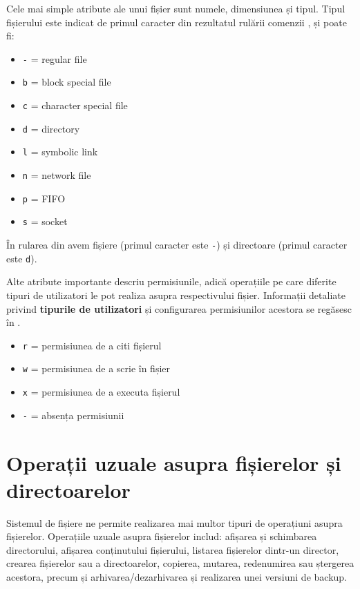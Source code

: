Cele mai simple atribute ale unui fișier sunt numele, dimensiunea și tipul.
Tipul fișierului este indicat de primul caracter din rezultatul rulării comenzii , și poate fi:

\begin{itemize}
  \item \texttt{-} = regular file
  \item \texttt{b} = block special file
  \item \texttt{c} = character special file
  \item \texttt{d} = directory
  \item \texttt{l} = symbolic link
  \item \texttt{n} = network file
  \item \texttt{p} = FIFO
  \item \texttt{s} = socket
\end{itemize}

În rularea din  avem fișiere (primul caracter este \texttt{-}) și directoare (primul caracter este \texttt{d}).

Alte atribute importante descriu permisiunile, adică operațiile pe care diferite tipuri de utilizatori le pot realiza asupra respectivului fișier.
Informații detaliate privind \textbf{tipurile de utilizatori} și configurarea permisiunilor acestora se regăsesc în .

\begin{itemize}
  \item \texttt{r} = permisiunea de a citi fișierul
  \item \texttt{w} = permisiunea de a scrie în fișier
  \item \texttt{x} = permisiunea de a executa fișierul
  \item \texttt{-} = absența permisiunii
\end{itemize}

\section{Operații uzuale asupra fișierelor și directoarelor}
\label{sec:fs:file-ops}

Sistemul de fișiere ne permite realizarea mai multor tipuri de operațiuni asupra fișierelor.
Operațiile uzuale asupra fișierelor includ: afișarea și schimbarea directorului, afișarea conținutului fișierului, listarea fișierelor dintr-un director, crearea fișierelor sau a directoarelor, copierea, mutarea, redenumirea sau ștergerea acestora, precum și arhivarea/dezarhivarea și realizarea unei versiuni de backup.

